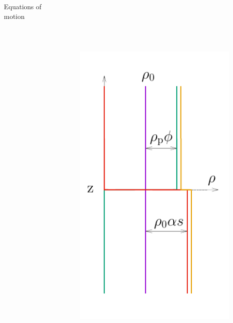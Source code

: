 \documentclass[final]{beamer} %
\begin{document}
\begin{frame}[t]
\begin{columns}[t]
\begin{column}{0.6\paperwidth}
\begin{block}{Equations of motion}
\begin{columns}[t]
        \end{columns}
      \end{block}
      
    \end{column}

    \begin{column}{0.3\paperwidth}

      \vspace{-3cm}
      
      \begin{columns}[t]
        \begin{column}{0.12\paperwidth}

          \vspace{-2.2cm}

          \begin{figure}
            \includegraphics[height=20cm]{init_config.pdf}
          \end{figure}
        \end{column}


\end{columns}
\end{column}
\end{columns}
\end{frame}
\end{document}
